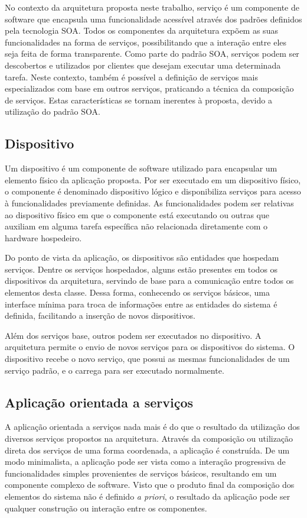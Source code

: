 No contexto da arquitetura proposta neste trabalho, serviço é um componente de software que
encapsula uma funcionalidade acessível através dos padrões definidos pela tecnologia \gls{SOA}.
Todos os componentes da arquitetura expõem as suas funcionalidades na forma de serviços,
possibilitando que a interação entre eles seja feita de forma transparente. Como parte do padrão
\gls{SOA}, serviços podem ser descobertos e utilizados por clientes que desejam executar uma
determinada tarefa. Neste contexto, também é possível a definição de serviços mais especializados
com base em outros serviços, praticando a técnica da composição de serviços. Estas características
se tornam inerentes à proposta, devido a utilização do padrão \gls{SOA}.


\subsection{Dispositivo}

Um dispositivo é um componente de software utilizado para encapsular um elemento físico da aplicação
proposta. Por ser executado em um dispositivo físico, o componente é denominado dispositivo lógico e
disponibiliza serviços para acesso à funcionalidades previamente definidas. As funcionalidades podem
ser relativas ao dispositivo físico em que o componente está executando ou outras que auxiliam em
alguma tarefa específica não relacionada diretamente com o hardware hospedeiro.

Do ponto de vista da aplicação, os dispositivos são entidades que hospedam serviços. Dentre os
serviços hospedados, alguns estão presentes em todos os dispositivos da arquitetura, servindo de
base para a comunicação entre todos os elementos desta classe. Dessa forma, conhecendo os serviços
básicos, uma interface mínima para troca de informações entre as entidades do sistema é definida,
facilitando a inserção de novos dispositivos.

Além dos serviços base, outros podem ser executados no dispositivo. A arquitetura permite o envio de
novos serviços para os dispositivos do sistema. O dispositivo recebe o novo serviço, que possui as
mesmas funcionalidades de um serviço padrão, e o carrega para ser executado normalmente.


\subsection{Aplicação orientada a serviços}

A aplicação orientada a serviços
nada mais é do que o resultado da utilização dos diversos serviços propostos na arquitetura. Através
da composição ou utilização direta dos serviços de uma forma coordenada, a aplicação é construída.
De um modo minimalista, a aplicação pode ser vista como a interação progressiva de funcionalidades
simples provenientes de serviços básicos, resultando em um componente complexo de software. Visto
que o produto final da composição dos elementos do sistema não é definido \textit{a priori}, o
resultado da aplicação pode ser qualquer construção ou interação entre os componentes.


